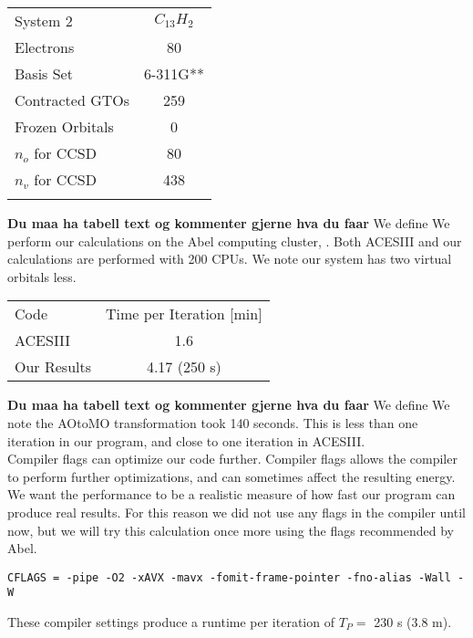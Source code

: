 \begin{center}
\begin{tabular}{ l c}
	\hline
  	System 2 & $C_{13} H_2$\\
  	Electrons & 80 \\
  	Basis Set & 6-311G** \\
  	Contracted GTOs & 259 \\
  	Frozen Orbitals & 0 \\
  	$n_o$ for CCSD & 80 \\
  	$n_v$ for CCSD & 438 \\ \hline
  	\\
	\end{tabular}
\end{center}
{\bf Du maa ha tabell text og kommenter gjerne hva du faar} We define
We perform our calculations on the Abel computing cluster,
\cite{abel_po_g_citation1234567}. Both ACESIII and our calculations
are performed with 200 CPUs. We note our system has two virtual
orbitals less. \\

\begin{center}
\begin{tabular}{ l c}
	\hline
  	Code & Time per Iteration [min] \\
  	ACESIII & 1.6 \\
  	Our Results & 4.17 (250 s) \\ \hline
	\end{tabular}
\end{center}
{\bf Du maa ha tabell text og kommenter gjerne hva du faar} We define
We note the AOtoMO transformation took 140 seconds. This is less than
one iteration in our program, and close to one iteration in
ACESIII. \\

Compiler flags can optimize our code further. Compiler flags allows
the compiler to perform further optimizations, and can sometimes
affect the resulting energy. We want the performance to be a realistic
measure of how fast our program can produce real results. For this
reason we did not use any flags in the compiler until now, but we will
try this calculation once more using the flags recommended by Abel.

\begin{lstlisting}
CFLAGS = -pipe -O2 -xAVX -mavx -fomit-frame-pointer -fno-alias -Wall -W
\end{lstlisting}
These compiler settings produce a runtime per iteration of $T_P = $ 230 s (3.8 m).




